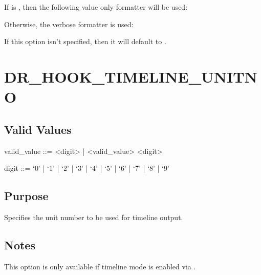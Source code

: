 \documentclass[letterpaper,10pt,english]{sphinxmanual}
\begin{document}
\sphinxAtStartPar
If  is , then the following value only formatter will be used:

\sphinxAtStartPar
{}

\sphinxAtStartPar
Otherwise, the verbose formatter is used:

\sphinxAtStartPar
{}

\sphinxAtStartPar
If this option isn’t specified, then it will default to .


\section{DR\_HOOK\_TIMELINE\_UNITNO}
\label{\detokenize{flag/flag:dr-hook-timeline-unitno}}\label{\detokenize{flag/flag:id107}}

\subsection{Valid Values}
\label{\detokenize{flag/flag:id108}}
\begin{DUlineblock}{0em}
\item[] valid\_value ::= \textless{}digit\textgreater{} | \textless{}valid\_value\textgreater{} \textless{}digit\textgreater{}
\item[] digit ::= ‘0’ | ‘1’ | ‘2’ | ‘3’ | ‘4’ | ‘5’ | ‘6’ | ‘7’ | ‘8’ | ‘9’
\end{DUlineblock}


\subsection{Purpose}
\label{\detokenize{flag/flag:id109}}
\sphinxAtStartPar
Specifies the unit number to be used for timeline output.


\subsection{Notes}
\label{\detokenize{flag/flag:id110}}
\sphinxAtStartPar
This option is only available if timeline mode is enabled via {\hyperref[\detokenize{flag/flag:dr-hook-timeline}]{}}.
\end{document}
